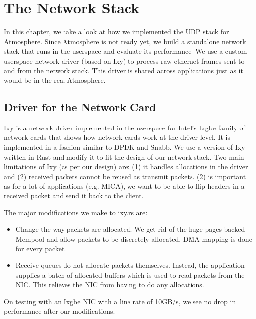\chapter{The Network Stack} %

\label{Chapter4} %


In this chapter, we take a look at how we implemented the UDP stack for Atmosphere. Since Atmosphere is not ready yet, we build a standalone network stack that runs in the userspace and evaluate its performance. We use a custom userspace network driver (based on Ixy) to process raw ethernet frames sent to and from the network stack. This driver is shared across applications just as it would be in the real Atmosphere.

\section{Driver for the Network Card}

Ixy is a network driver implemented in the userspace for Intel's Ixgbe family of network cards that shows how network cards work at the driver level. It is implemented in a fashion similar to DPDK and Snabb. We use a version of Ixy written in Rust and modify it to fit the design of our network stack. Two main limitations of Ixy (as per our design) are: (1) it handles allocations in the driver and (2) received packets cannot be reused as transmit packets. (2) is important as for a lot of applications (e.g. MICA), we want to be able to flip headers in a received packet and send it back to the client. 

The major modifications we make to ixy.rs are:
\begin{itemize}
    \item{Change the way packets are allocated. We get rid of the huge-pages backed Mempool and allow packets to be discretely allocated. DMA mapping is done for every packet. }
\item{Receive queues do not allocate packets themselves. Instead, the application supplies a batch of allocated buffers which is used to read packets from the NIC. This relieves the NIC from having to do any allocations. }
\end{itemize}

On testing with an Ixgbe NIC with a line rate of 10GB/s, we see no drop in performance after our modifications.

